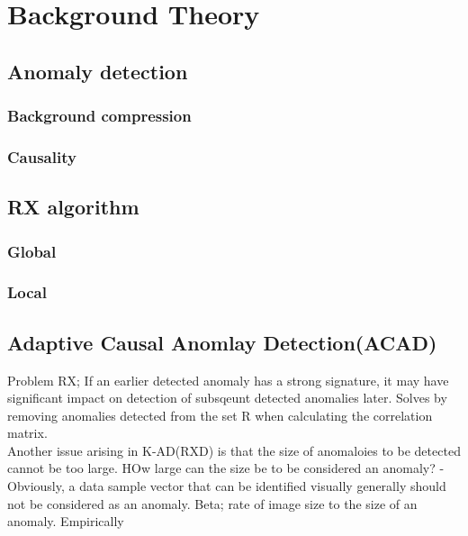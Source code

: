 \newpage
\chapter{Background Theory}
\label{sec:theory}

\section{Anomaly detection}

\subsection{Background compression}

\subsection{Causality}

\section{RX algorithm}

\subsection{Global}

\subsection{Local}

\section{Adaptive Causal Anomlay Detection(ACAD)}
Problem RX; If an earlier detected anomaly has a strong signature, it may have significant impact on detection of subsqeunt detected anomalies later. Solves by removing anomalies detected from the set R when calculating the correlation matrix.\\
Another issue arising in K-AD(RXD) is that the size of anomaloies to be detected cannot be too large. HOw large can the size be to be considered an anomaly? - Obviously, a data sample vector that can be identified visually generally should not be considered as an anomaly. Beta; rate of image size to the size of an anomaly. Empirically \\

